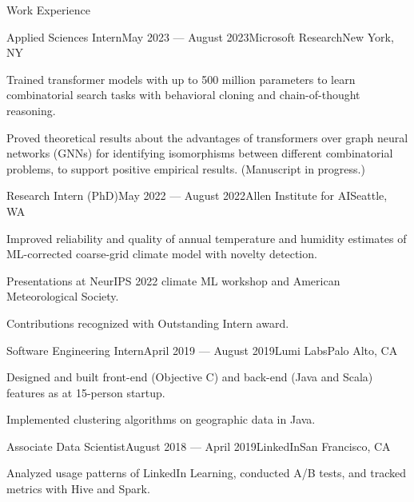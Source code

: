 \documentclass{resume} %
\begin{document}
\begin{rSection}{Work Experience}

\begin{rSubsection}{Applied Sciences Intern}{May 2023 --- August 2023}{Microsoft Research}{New York, NY}
\item Trained transformer models with up to 500 million parameters to learn combinatorial search tasks with behavioral cloning and chain-of-thought reasoning.
\item Proved theoretical results about the advantages of transformers over graph neural networks (GNNs) for identifying isomorphisms between different combinatorial problems, to support positive empirical results. (Manuscript in progress.) 
\end{rSubsection}

\begin{rSubsection}{Research Intern (PhD)}{May 2022 --- August 2022}{Allen Institute for AI}{Seattle, WA}
\item Improved reliability and quality of annual temperature and humidity estimates of ML-corrected coarse-grid climate model with novelty detection.
\item Presentations at NeurIPS 2022 climate ML workshop and American Meteorological Society.
\item Contributions recognized with Outstanding Intern award.
\end{rSubsection}


\begin{rSubsection}{Software Engineering Intern}{April 2019 --- August 2019}{Lumi Labs}{Palo Alto, CA}
\item Designed and built front-end (Objective C) and back-end (Java and Scala) features as at 15-person startup.
\item Implemented clustering algorithms on geographic data in Java.
\end{rSubsection}

\begin{rSubsection}{Associate Data Scientist}{August 2018 --- April 2019}{LinkedIn}{San Francisco, CA}
\item Analyzed usage patterns of LinkedIn Learning, conducted A/B tests, and tracked metrics with Hive and Spark.
\end{rSubsection}
\end{rSection}
\newpage
\end{document}
